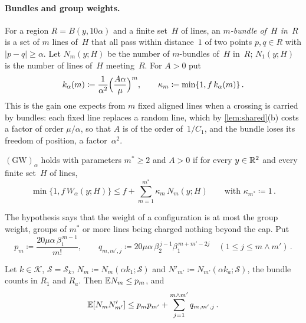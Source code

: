 \documentclass[11pt,letterpaper]{article}
\newcommand{\cS}{\mathcal S}
\begin{document}
\paragraph{Bundles and group weights.} For a region $R=B(y,10\alpha)$ and a finite set~$H$ of lines, an \emph{$m$-bundle of~$H$ in~$R$} is a set of $m$ lines of~$H$ that all pass within distance~$1$ of two points $p,q\in R$ with $\lvert p-q\rvert\ge\alpha$. Let $N_m(y;H)$ be the number of $m$-bundles of~$H$ in~$R$; $N_1(y;H)$ is the number of lines of~$H$ meeting~$R$. For $A>0$ put
\begin{equation}
\label{eq:k}
  k_\alpha(m)\coloneqq\frac{1}{\alpha^2}\Bigl(\frac{A\alpha}{\mu}\Bigr)^{m},\qquad\kappa_m\coloneqq\min\{1,f\,k_\alpha(m)\}\,.
\end{equation}
This is the gain one expects from $m$ fixed aligned lines when a crossing is carried by bundles: each fixed line replaces a random line, which by \cref{lem:shared}(b) costs a factor of order $\mu/\alpha$, so that $A$ is of the order of~$1/C_1$, and the bundle loses its freedom of position, a factor~$\alpha^2$.

\begin{definition}
\label{def:GW}
$\mathrm{(GW)}_\alpha$ holds with parameters $m^*\ge2$ and $A>0$ if for every $y\in\mathbb R^2$ and every finite set~$H$ of lines,
\begin{equation}
\label{eq:GW}
  \min\bigl\{1,f\,W_\alpha(y;H)\bigr\}\le f+\sum_{m=1}^{m^*}\kappa_m\,N_m(y;H)\qquad\text{with }\kappa_{m^*}\coloneqq1\,.
\end{equation}
\end{definition}

The hypothesis says that the weight of a configuration is at most the group weight, groups of $m^*$ or more lines being charged nothing beyond the cap. Put
\begin{equation}
\label{eq:pq}
  p_m\coloneqq\frac{20\mu\alpha\,\beta_1^{\,m-1}}{m!},\qquad q_{m,m',j}\coloneqq20\mu\alpha\,\beta_2^{\,j-1}\beta_1^{\,m+m'-2j}\quad(1\le j\le m\wedge m')\,.
\end{equation}

\begin{lemma}
\label{lem:counts}
Let $k\in\mathcal K$, $\cS=\cS_k$, $N_m\coloneqq N_m(\alpha k_1;\cS)$ and $N'_{m'}\coloneqq N_{m'}(\alpha k_a;\cS)$, the bundle counts in $R_1$ and $R_a$. Then $\mathbb E N_m\le p_m$, and
\begin{equation}
\label{eq:pairs}
  \mathbb E[N_mN'_{m'}]\le p_mp_{m'}+\sum_{j=1}^{m\wedge m'}q_{m,m',j}\,.
\end{equation}
\end{lemma}
\end{document}
